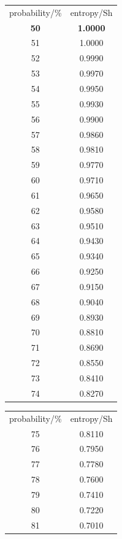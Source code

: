 \documentclass[a4paper,12pt,%
onecolumn,oneside,article,%
british%
]{memoir}
\renewcommand*{\|}[1][]{\nonscript\:#1\vert\nonscript\:\mathopen{}}
\begin{document}
\begin{table}
  \bigskip

  \begin{minipage}{0.49\linewidth}
    \begin{tabular}{cc}
      probability/\% & entropy/\unit{Sh}
      \\[1ex]
      \bfseries 50 &\bfseries  1.0000 \\
      51 & 1.0000 \\
      52 & 0.9990 \\
      53 & 0.9970 \\
      54 & 0.9950 \\
      55 & 0.9930 \\
      56 & 0.9900 \\
      57 & 0.9860 \\
      58 & 0.9810 \\
      59 & 0.9770 \\
      60 & 0.9710 \\
      61 & 0.9650 \\
      62 & 0.9580 \\
      63 & 0.9510 \\
      64 & 0.9430 \\
      65 & 0.9340 \\
      66 & 0.9250 \\
      67 & 0.9150 \\
      68 & 0.9040 \\
      69 & 0.8930 \\
      70 & 0.8810 \\
      71 & 0.8690 \\
      72 & 0.8550 \\
      73 & 0.8410 \\
      74 & 0.8270 \\
    \end{tabular}
  \end{minipage}
\begin{minipage}{0.49\linewidth}
    \begin{tabular}{cc}
      probability/\% & entropy/\unit{Sh}
      \\[1ex]
      75 & 0.8110 \\
      76 & 0.7950 \\
      77 & 0.7780 \\
      78 & 0.7600 \\
      79 & 0.7410 \\
      80 & 0.7220 \\
      81 & 0.7010 \\

\end{tabular}
\end{minipage}
\end{table}
\end{document}
